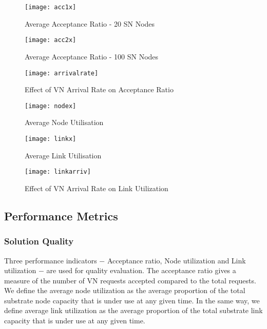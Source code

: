 \documentclass[journal]{IEEEtran}
\begin{document}
\begin{figure*}[t]
\setlength{\abovecaptionskip}{7pt plus 0pt minus 0pt}
\setlength{\belowcaptionskip}{7pt plus 0pt minus 0pt}
\begin{minipage}{.33\textwidth}
\centering
\resizebox{.99\textwidth}{!}
{\texttt{[image: acc1x]}}
  \caption{Average Acceptance Ratio - 20 SN Nodes}\label{AcceptanceRatio1}
\end{minipage}
\begin{minipage}{.33\textwidth}
\centering
\resizebox{.99\textwidth}{!}
{\texttt{[image: acc2x]}}
  \caption{Average Acceptance Ratio - 100 SN Nodes}\label{AcceptanceRatio2}
\end{minipage}
\begin{minipage}{.33\textwidth}
\centering
\resizebox{0.99\textwidth}{!}
{\texttt{[image: arrivalrate]}}
  \caption{Effect of VN Arrival Rate on Acceptance Ratio}
  \label{arrivalrate}
\end{minipage}
\begin{minipage}{.33\textwidth}
\centering
\resizebox{0.99\textwidth}{!}
{\texttt{[image: nodex]}}
  \caption{Average Node Utilisation}
  \label{NodeUtilization}
\end{minipage}
\begin{minipage}{.33\textwidth}
\resizebox{.99\textwidth}{!}
{\texttt{[image: linkx]}}
  \caption{Average Link Utilisation}
  \label{LinkUtilization}
\end{minipage}
\begin{minipage}{.33\textwidth}
\resizebox{.99\textwidth}{!}
{\texttt{[image: linkarriv]}}
  \caption{Effect of VN Arrival Rate on Link Utilization}
  \label{linkarriv}
\end{minipage}

\end{figure*}

\subsection{Performance Metrics}
\subsubsection{Solution Quality} Three performance indicators $-$ Acceptance ratio, Node utilization and Link utilization $-$ are used for quality evaluation. The acceptance ratio gives a measure of the number of \ac{VN} requests accepted compared to the total requests. We define the average node utilization as the average proportion of the total substrate node capacity that is under use at any given time. In the same way, we define average link utilization as the average proportion of the total substrate link capacity that is under use at any given time.
\end{document}
